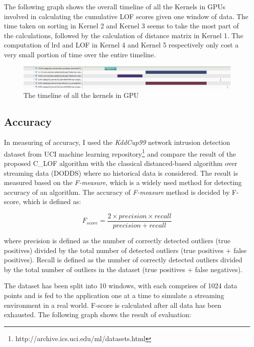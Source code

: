 \documentclass[11pt]{article}       %
\begin{document}
The following graph shows the overall timeline of all the Kernels in GPUs involved in calculating the cumulative LOF scores given one window of data. The time taken on sorting in Kernel 2 and Kernel 3 seems to take the most part of the calculations, followed by the calculation of distance matrix in Kernel 1. The computation of lrd and LOF in Kernel 4 and Kernel 5 respectively only cost a very small portion of time over the entire timeline. 

\begin{figure}[h!]
\centering
\includegraphics[width=15cm]{Figures/timeline}
\caption{The timeline of all the kernels in GPU}
\label{fig:timeline}
\end{figure}

\subsection{Accuracy}

In measuring of accuracy, I used the \textit{KddCup99} network intrusion detection dataset from UCI machine learning repository\footnote{http://archive.ics.uci.edu/ml/datasets.html} and compare the result of the proposed C\_LOF algorithm with the classical distanced-based algorithm over streaming data (DODDS) where no historical data is considered. The result is measured based on the \textit{F-measure}, which is a widely used method for detecting accuracy of an algorithm. The accuracy of \textit{F-measure} method is decided by F-score, which is defined as:

\[ F_{score} = \frac{2 \times precision \times recall}{precision + recall}  \]

where precision is defined as the number of correctly detected outliers (true positives) divided by the total number of detected outliers (true positives + false positives). Recall is defined as the number of correctly detected outliers divided by the total number of outliers in the dataset (true positives + false negatives). 

The dataset has been split into 10 windows, with each comprises of 1024 data points and is fed to the application one at a time to simulate a streaming environment in a real world. F-score is calculated after all data has been exhausted. The following graph shows the result of evaluation:
\end{document}
